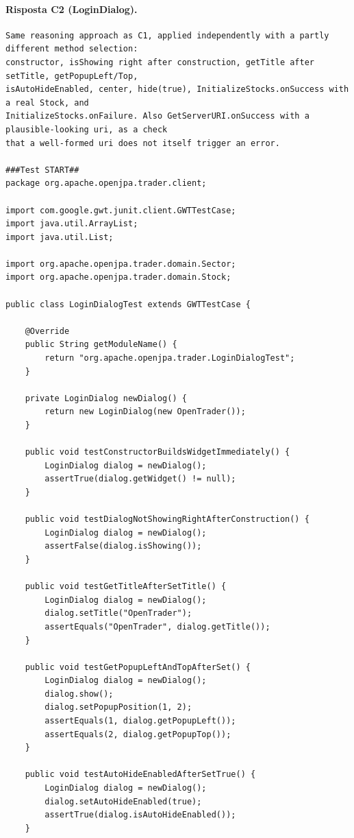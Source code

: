 \paragraph*{Risposta C2 (LoginDialog).}
\label{risposta:ld-c2}
\begin{lstlisting}
Same reasoning approach as C1, applied independently with a partly different method selection:
constructor, isShowing right after construction, getTitle after setTitle, getPopupLeft/Top,
isAutoHideEnabled, center, hide(true), InitializeStocks.onSuccess with a real Stock, and
InitializeStocks.onFailure. Also GetServerURI.onSuccess with a plausible-looking uri, as a check
that a well-formed uri does not itself trigger an error.

###Test START##
package org.apache.openjpa.trader.client;

import com.google.gwt.junit.client.GWTTestCase;
import java.util.ArrayList;
import java.util.List;

import org.apache.openjpa.trader.domain.Sector;
import org.apache.openjpa.trader.domain.Stock;

public class LoginDialogTest extends GWTTestCase {

    @Override
    public String getModuleName() {
        return "org.apache.openjpa.trader.LoginDialogTest";
    }

    private LoginDialog newDialog() {
        return new LoginDialog(new OpenTrader());
    }

    public void testConstructorBuildsWidgetImmediately() {
        LoginDialog dialog = newDialog();
        assertTrue(dialog.getWidget() != null);
    }

    public void testDialogNotShowingRightAfterConstruction() {
        LoginDialog dialog = newDialog();
        assertFalse(dialog.isShowing());
    }

    public void testGetTitleAfterSetTitle() {
        LoginDialog dialog = newDialog();
        dialog.setTitle("OpenTrader");
        assertEquals("OpenTrader", dialog.getTitle());
    }

    public void testGetPopupLeftAndTopAfterSet() {
        LoginDialog dialog = newDialog();
        dialog.show();
        dialog.setPopupPosition(1, 2);
        assertEquals(1, dialog.getPopupLeft());
        assertEquals(2, dialog.getPopupTop());
    }

    public void testAutoHideEnabledAfterSetTrue() {
        LoginDialog dialog = newDialog();
        dialog.setAutoHideEnabled(true);
        assertTrue(dialog.isAutoHideEnabled());
    }


\end{lstlisting}
